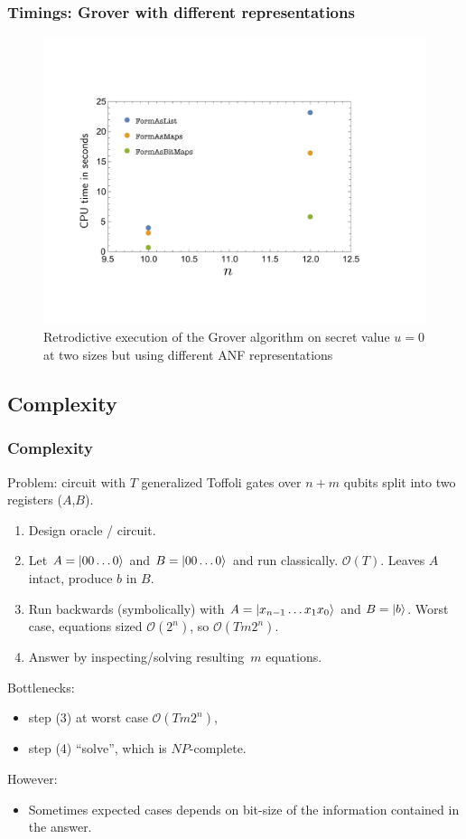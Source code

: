 \documentclass{beamer}
\begin{document}
\begin{frame}
  \frametitle{Timings: Grover with different representations}
\begin{figure}
\includegraphics[scale=0.30]{../../pepm/Figure14.pdf}
\caption{Retrodictive
  execution of the Grover algorithm on secret value $u=0$ at two
  sizes but using different ANF representations}
\end{figure}
\end{frame}

\subsection[Complexity]{Complexity}

\begin{frame}
  \frametitle{Complexity}
Problem: circuit with $T$ generalized Toffoli gates over $n+m$
  qubits split into two registers ($A$,$B$).

\begin{enumerate}
\item Design oracle / circuit.
\item Let $A = \ket{00\ldots 0}$ and $B = \ket{00\ldots 0}$ and run classically.
    $\mathcal{O}(T)$.
Leaves $A$ intact, produce $b$ in $B$.
\item Run backwards (symbolically) with
$A = \ket{ x_{n-1} \ldots x_1 x_0}$ and $B = \ket{b}$. Worst case,
    equations sized $\mathcal{O}(2^n)$, so $\mathcal{O}(Tm 2^n)$.
\item Answer by inspecting/solving resulting~$m$ equations. 
\end{enumerate}

\pause
  Bottlenecks:
  \begin{itemize}
    \item step (3) at worst case $\mathcal{O}(Tm 2^n)$, 
    \item step (4) ``solve'', which is $\mathit{NP}$-complete.
  \end{itemize}
  However:
  \begin{itemize}
    \item Sometimes expected cases depends on bit-size of the
      information contained in the answer.
  \end{itemize}
\end{frame}
\end{document}
